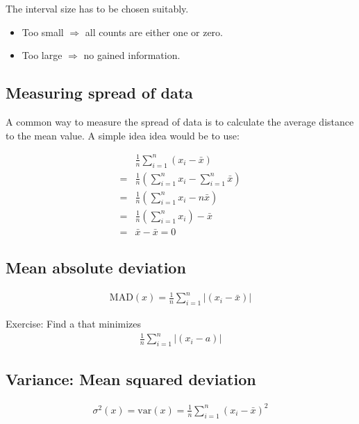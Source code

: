 The interval size has to be chosen suitably.

\begin{itemize}
    \item Too small $\Rightarrow$ all counts are either one or zero. 
    \item Too large $\Rightarrow$ no gained information.
\end{itemize}
    
\subsection {Measuring spread of data}
A common way to measure the spread of data is to calculate the average distance to the mean value.
A simple idea idea would be to use:

\begin{align}
   & \frac{1}{n}\sum_{i=1}^{n}(x_{i}-\bar{x}) \\
  =& \frac{1}{n}\left(\sum_{i=1}^{n}x_{i} - \sum_{i=1}^{n}\bar{x}\right)\\
  =& \frac{1}{n}\left(\sum_{i=1}^{n}x_{i} - n\bar{x}\right) \\
  =& \frac{1}{n}\left(\sum_{i=1}^{n}x_{i}\right) - \bar{x} \\
  =& \bar{x}-\bar{x} = 0
\end{align}
    
\subsection {Mean absolute deviation}
\begin{align}
  \text{MAD}(x) = \frac{1}{n}\sum_{i=1}^{n}|(x_{i}-\bar{x})|
\end{align}
    
Exercise: Find a that minimizes
\begin{align}
    \frac{1}{n}\sum_{i=1}^{n}|(x_{i}-a)|
\end{align}
    
    
\subsection {Variance: Mean squared deviation}

\begin{align}
\sigma^2(x) = \text{var}(x) = \frac{1}{n}\sum_{i=1}^{n}\left(x_{i}-\bar{x}\right)^2
\end{align}

